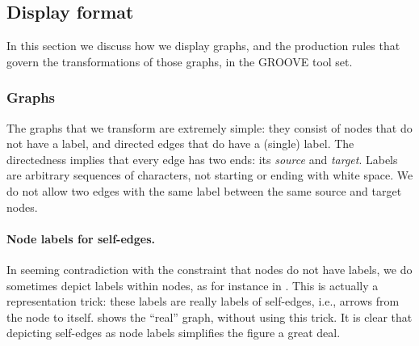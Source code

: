 \subsection{Display format}

In this section we discuss how we display graphs, and the production rules that
govern the transformations of those graphs, in the GROOVE tool set.

\subsubsection{Graphs}

The graphs that we transform are extremely simple: they consist of nodes that
do not have a label, and directed edges that do have a (single) label. The
directedness implies that every edge has two ends: its \emph{source} and
\emph{target}. Labels are arbitrary sequences of characters, not starting or
ending with white space. We do not allow two edges with the same label between
the same source and target nodes.

\paragraph{Node labels for self-edges.}

In seeming contradiction with the constraint that nodes do not have labels, we
do sometimes depict labels within nodes, as for instance in
.  This is actually a representation trick:
these labels are really labels of self-edges, i.e., arrows from the node to
itself.  shows the ``real'' graph, without using this trick.
It is clear that depicting self-edges as node labels simplifies the figure a
great deal.
%


